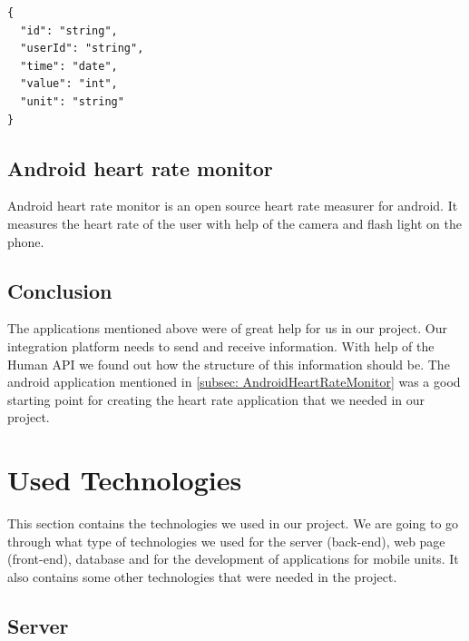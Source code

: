 \begin{verbatim}
{
  "id": "string",
  "userId": "string",
  "time": "date",
  "value": "int",
  "unit": "string"
}
\end{verbatim}

\subsection{Android heart rate monitor} \nocite{AndroidHeartRateMonitor}
\label{subsec: AndroidHeartRateMonitor}

Android heart rate monitor is an open source heart rate measurer for android.
It measures the heart rate of the user with help of the camera and flash light on the phone.

\subsection{Conclusion}

The applications mentioned above were of great help for us in our project.
Our integration platform needs to send and receive information. 
With help of the Human API we found out how the structure of this information should be.
The android application mentioned in \ref{subsec: AndroidHeartRateMonitor} was a good starting point for creating the heart rate application that we needed in our project.


\section{Used Technologies}
\label{section:used-technologies}

This section contains the technologies we used in our project.
We are going to go through what type of technologies we used for the server (back-end), web page (front-end), database and for the development of applications for mobile units. 
It also contains some other technologies that were needed in the project.

\subsection{Server}

